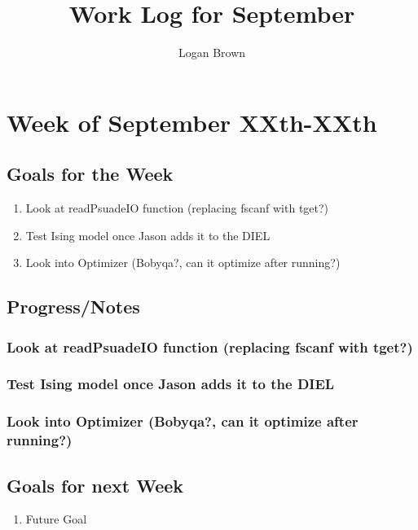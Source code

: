 

\title{Work Log for September}
\author{Logan Brown}


\maketitle


\setcounter{section}{0} %
\setcounter{subsection}{-1}
\setcounter{subsubsection}{0}

\section{Week of September XXth-XXth}
\subsection{Goals for the Week}
\begin{enumerate}
	\item Look at readPsuadeIO function (replacing fscanf with tget?)
	\item Test Ising model once Jason adds it to the DIEL
	\item Look into Optimizer (Bobyqa?, can it optimize after running?)
\end{enumerate}

\subsection{Progress/Notes}

\subsubsection{Look at readPsuadeIO function (replacing fscanf with tget?)}

\subsubsection{Test Ising model once Jason adds it to the DIEL}

\subsubsection{Look into Optimizer (Bobyqa?, can it optimize after running?)}



\subsection{Goals for next Week}
\begin{enumerate}
\item Future Goal
\end{enumerate}


